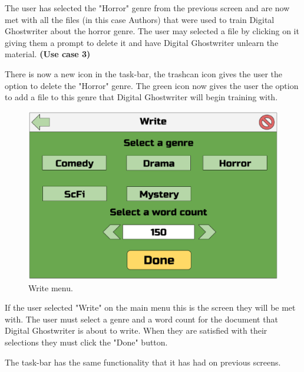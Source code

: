 \documentclass[12pt]{article}
\begin{document}
The user has selected the "Horror" genre from the previous screen and are now met with all the files (in this case Authors) that were used to train Digital Ghostwriter about the horror genre. The user may selected a file by clicking on it giving them a prompt to delete it and have Digital Ghostwriter unlearn the material. \newline \textbf{(Use case 3)}

There is now a new icon in the task-bar, the trashcan icon gives the user the option to delete the "Horror" genre. The green icon now gives the user the option to add a file to this genre that Digital Ghostwriter will begin training with.

\newpage

\begin{figure}[ht]
  \centering
    \includegraphics[scale=0.5]{W1.eps}
    \caption{Write menu.}
\end{figure}

If the user selected "Write" on the main menu this is the screen they will be met with. The user must select a genre and a word count for the document that Digital Ghostwriter is about to write. When they are satisfied with their selections they must click the "Done" button.

The task-bar has the same functionality that it has had on previous screens.

\newpage
\end{document}
